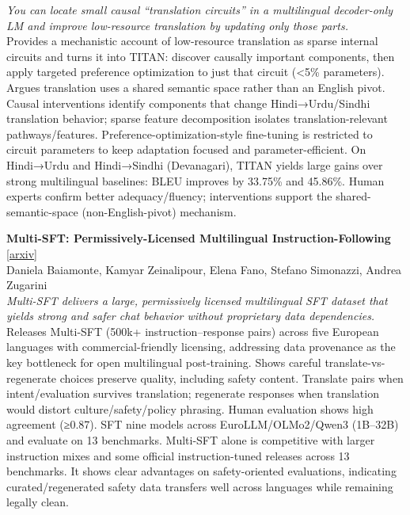 \documentclass[12pt,letterpaper]{article}
\begin{document}
{\small\textit{You can locate small causal ``translation circuits'' in a multilingual decoder-only LM and improve low-resource translation by updating only those parts.}}\\[1pt]
{\footnotesize Provides a mechanistic account of low-resource translation as sparse internal circuits and turns it into TITAN: discover causally important components, then apply targeted preference optimization to just that circuit (<5\% parameters). Argues translation uses a shared semantic space rather than an English pivot. Causal interventions identify components that change Hindi→Urdu/Sindhi translation behavior; sparse feature decomposition isolates translation-relevant pathways/features. Preference-optimization-style fine-tuning is restricted to circuit parameters to keep adaptation focused and parameter-efficient. On Hindi→Urdu and Hindi→Sindhi (Devanagari), TITAN yields large gains over strong multilingual baselines: BLEU improves by 33.75\% and 45.86\%. Human experts confirm better adequacy/fluency; interventions support the shared-semantic-space (non-English-pivot) mechanism.}

\medskip

{\small\textbf{Multi-SFT: Permissively-Licensed Multilingual Instruction-Following}} {\scriptsize[\href{https://arxiv.org/abs/2610.22086}{arxiv}]}\\
{\scriptsize Daniela Baiamonte, Kamyar Zeinalipour, Elena Fano, Stefano Simonazzi, Andrea Zugarini}\\

{\small\textit{Multi-SFT delivers a large, permissively licensed multilingual SFT dataset that yields strong and safer chat behavior without proprietary data dependencies.}}\\[1pt]
{\footnotesize Releases Multi-SFT (500k+ instruction--response pairs) across five European languages with commercial-friendly licensing, addressing data provenance as the key bottleneck for open multilingual post-training. Shows careful translate-vs-regenerate choices preserve quality, including safety content. Translate pairs when intent/evaluation survives translation; regenerate responses when translation would distort culture/safety/policy phrasing. Human evaluation shows high agreement (≥0.87). SFT nine models across EuroLLM/OLMo2/Qwen3 (1B--32B) and evaluate on 13 benchmarks. Multi-SFT alone is competitive with larger instruction mixes and some official instruction-tuned releases across 13 benchmarks. It shows clear advantages on safety-oriented evaluations, indicating curated/regenerated safety data transfers well across languages while remaining legally clean.}
\end{document}
